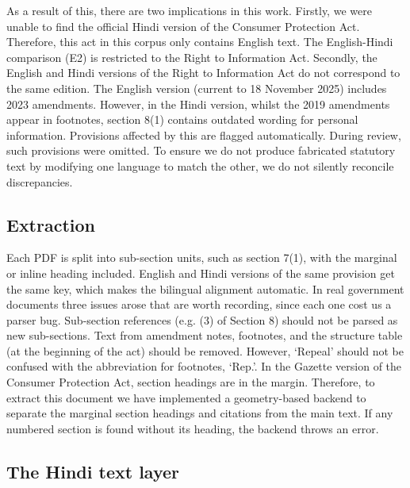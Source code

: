 \documentclass[conference]{IEEEtran}
\begin{document}
As a result of this, there are two implications in this work. Firstly, we were unable to find the official Hindi version of the Consumer Protection Act. Therefore, this act in this corpus only contains English text. The English-Hindi comparison (E2) is restricted to the Right to Information Act. Secondly, the English and Hindi versions of the Right to Information Act do not correspond to the same edition. The English version (current to 18 November 2025) includes 2023 amendments. However, in the Hindi version, whilst the 2019 amendments appear in footnotes, section 8(1) contains outdated wording for personal information. Provisions affected by this are flagged automatically. During review, such provisions were omitted. To ensure we do not produce fabricated statutory text by modifying one language to match the other, we do not silently reconcile discrepancies.

\subsection{Extraction}

Each PDF is split into sub-section units, such as section 7(1), with the marginal or inline heading included. English and Hindi versions of the same provision get the same key, which makes the bilingual alignment automatic. In real government documents three issues arose that are worth recording, since each one cost us a parser bug. Sub-section references (e.g. (3) of Section 8) should not be parsed as new sub-sections. Text from amendment notes, footnotes, and the structure table (at the beginning of the act) should be removed. However, ‘Repeal’ should not be confused with the abbreviation for footnotes, ‘Rep.’. In the Gazette version of the Consumer Protection Act, section headings are in the margin. Therefore, to extract this document we have implemented a geometry-based backend to separate the marginal section headings and citations from the main text. If any numbered section is found without its heading, the backend throws an error.

\subsection{The Hindi text layer}
\end{document}
